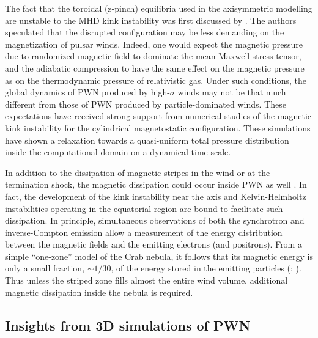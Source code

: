 The fact that the toroidal (z-pinch) equilibria used in the axisymmetric modelling \citep[e.g.][]{begelman1992} are unstable to the MHD kink instability was first discussed by \cite{begelman1998}.  
The authors speculated that the disrupted configuration may be less demanding on the magnetization of pulsar winds. Indeed, one would expect the magnetic pressure due to randomized magnetic field to dominate the mean Maxwell stress tensor, and the adiabatic compression to have the same effect on the magnetic pressure as on the thermodynamic pressure of relativistic gas. Under such conditions, the global dynamics of PWN produced by high-$\sigma$ winds may not be that much different from those of PWN produced by particle-dominated winds. These expectations have received strong support from numerical studies \citep{Mizuno:2011aa} of the magnetic kink instability for the cylindrical magnetostatic configuration.  These simulations have shown a relaxation towards a quasi-uniform total pressure distribution inside the computational domain on a dynamical time-scale. 

In addition to the dissipation of magnetic stripes in the wind or at the termination shock, the magnetic dissipation could occur inside PWN as well \citep{lyutikov2010c,komissarov2013}. In fact, the development of the kink instability near the axis and Kelvin-Helmholtz instabilities operating in the equatorial region \citep{camus2009} are bound to facilitate such dissipation. In principle, simultaneous observations of both the synchrotron and inverse-Compton emission allow a measurement of the energy distribution between the magnetic fields and the emitting electrons (and positrons). From a simple ``one-zone'' model of the Crab nebula, it follows that its magnetic energy is only a small fraction, $\sim1/30$, of the energy stored in the emitting particles (\cite{MeyerHorns2010}; \cite{komissarov2013}). Thus unless the striped zone fills almost the entire wind volume, additional magnetic dissipation inside the nebula is required.  


\subsection{Insights from 3D simulations of PWN}

